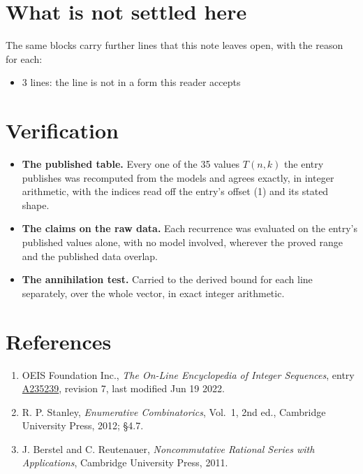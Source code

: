 \documentclass[11pt]{article}
\theoremstyle{definition}
\begin{document}
\section{What is not settled here}

The same blocks carry further lines that this note leaves open, with the reason for each:

\begin{itemize}

\item 3 lines: the line is not in a form this reader accepts

\end{itemize}

\section{Verification}

\begin{itemize}

\item {\bfseries The published table.} Every one of the 35 values $T(n,k)$ the entry publishes was recomputed from the models and agrees exactly, in integer arithmetic, with the indices read off the entry's offset (1) and its stated shape.

\item {\bfseries The claims on the raw data.} Each recurrence was evaluated on the entry's published values alone, with no model involved, wherever the proved range and the published data overlap.

\item {\bfseries The annihilation test.} Carried to the derived bound for each line separately, over the whole vector, in exact integer arithmetic.

\end{itemize}

\section{References}

\begin{enumerate}

\item OEIS Foundation Inc., \emph{The On-Line Encyclopedia of Integer Sequences}, entry \href{https://oeis.org/A235239}{A235239}, revision 7, last modified Jun 19 2022.

\item R. P. Stanley, \emph{Enumerative Combinatorics}, Vol.~1, 2nd ed., Cambridge University Press, 2012; \S4.7.

\item J. Berstel and C. Reutenauer, \emph{Noncommutative Rational Series with Applications}, Cambridge University Press, 2011.

\end{enumerate}
\end{document}
